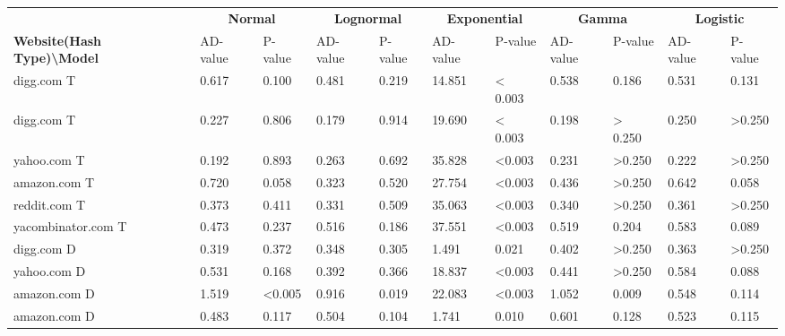 \begin{tabular}{lllllllllll}
  \toprule
  & \multicolumn{2}{c}{\textbf{Normal}}
  & \multicolumn{2}{c}{\textbf{Lognormal}}
  & \multicolumn{2}{c}{\textbf{Exponential}}
  & \multicolumn{2}{c}{\textbf{Gamma}}
  & \multicolumn{2}{c}{\textbf{Logistic}}\\

  \textbf{Website(Hash Type)\textbackslash Model}
  & AD-value
  & P-value
  & AD-value
  & P-value
  & AD-value
  & P-value
  & AD-value
  & P-value
  & AD-value
  & P-value \\
  \midrule
  digg.com T & 0.617 &  0.100 & 0.481 &  0.219 &
  14.851 & < 0.003 & 0.538 &  0.186 & 0.531 &  0.131\\ 
  digg.com T & 0.227 &  0.806 & 0.179 &  0.914 &
  19.690 &  < 0.003 & 0.198 &  > 0.250 & 0.250 & >0.250\\
  yahoo.com T & 0.192 &  0.893 & 0.263 &  0.692 &
  35.828 & <0.003 &   0.231 & >0.250 & 0.222 & >0.250\\
  amazon.com T & 0.720 &  0.058 & 0.323 &  0.520 & 
  27.754 & <0.003 &  0.436 & >0.250 & 0.642 &  0.058\\
  reddit.com T & 0.373 &  0.411 & 0.331  & 0.509 & 
  35.063 & <0.003 & 0.340 & >0.250 & 0.361 & >0.250\\
  yacombinator.com T & 0.473 &  0.237 & 0.516 &  0.186 &
  37.551 & <0.003 & 0.519 &  0.204 & 0.583 &  0.089\\

  digg.com D & 0.319 &  0.372 & 0.348 &  0.305 &
  1.491 &  0.021 &  0.402 & >0.250 & 0.363 & >0.250\\
  yahoo.com D & 0.531 &  0.168 & 0.392 &  0.366 &
  18.837 & <0.003 & 0.441 & >0.250 & 0.584  & 0.088\\
  amazon.com D & 1.519 & <0.005 & 0.916 &  0.019 &
  22.083 & <0.003 & 1.052 &  0.009 & 0.548 &  0.114\\
  amazon.com D & 0.483 & 0.117 &  0.504 & 0.104 &
  1.741 & 0.010 & 0.601 & 0.128 & 0.523 & 0.115\\

\end{tabular}

